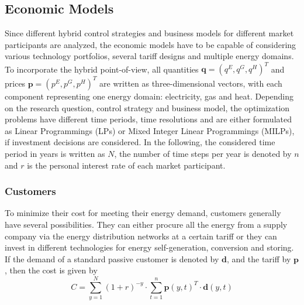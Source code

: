 \documentclass[a4paper,twoside]{article}
\begin{document}
\subsection{Economic Models}
\label{sec:econ-3}
\noindent
Since different hybrid control strategies and business models for
different market participants are analyzed, the economic models have
to be capable of considering various technology portfolios, several
tariff designs and multiple energy domains. To incorporate the hybrid
point-of-view, all quantities $\mathbf{q}=(q^E, q^G, q^H )^T$ and prices $\mathbf{p}=(p^E, p^G, p^H )^T$ are written as
three-dimensional vectors,
with each component representing one energy domain: electricity,
gas and heat. Depending on the research question, control strategy and
business model, the optimization problems have different time periods,
time resolutions and are either formulated as Linear Programmings
(LPs) or Mixed Integer Linear Programmings (MILPs), if investment
decisions are considered. In the following, the considered
time period in years is written as $N$, the number of time steps per
year is denoted by $n$ and $r$ is the personal interest rate of each
market participant. 


\subsubsection{Customers}
\noindent
To minimize their cost for meeting their energy demand, customers
generally have several possibilities. They can either procure all the
energy from a supply company via the energy distribution networks at a
certain tariff or they can invest in different technologies for energy
self-generation, conversion and storing.
If the demand of a standard passive customer is
denoted by $\mathbf{d}$, and the tariff by $\mathbf{p}$, then the cost is given by 
\begin{equation}
  C = \sum_{y=1}^{N}(1+r)^{-y} \cdot \sum_{t=1}^{n} \mathbf{p}(y,t)^{T} \cdot \mathbf{d}(y,t)
\end{equation}
\end{document}
